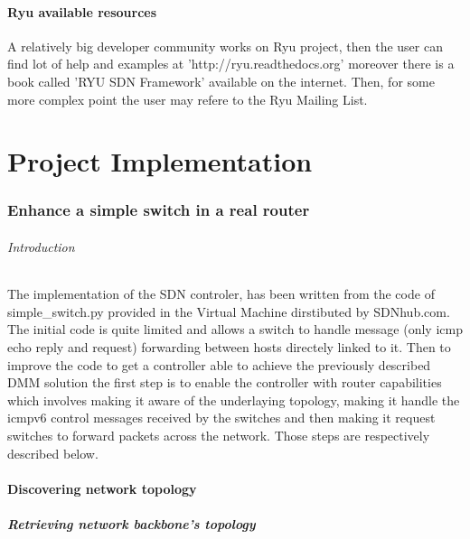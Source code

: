 \documentclass{article}
\begin{document}
\subsection{Ryu available resources}

A relatively big developer community works on Ryu project, then the
user can find lot of help and examples at 'http://ryu.readthedocs.org'
moreover there is a book called 'RYU SDN Framework' available on the
internet.  Then, for some more complex point the user may refere to
the Ryu Mailing List.

\part{Project Implementation}

\section{Enhance a simple switch in a real router}

\paragraph{Introduction}
The implementation of the SDN controler, has been written from the
code of simple\_switch.py provided in the Virtual Machine dirstibuted
by SDNhub.com. The initial code is quite limited and allows a switch
to handle message (only icmp echo reply and request) forwarding between
hosts directely linked to it. Then to improve the code to get a
controller able to achieve the previously described DMM solution the
first step is to enable the controller with router capabilities which
involves making it aware of the underlaying topology, making it handle
the icmpv6 control messages received by the switches and then making
it request switches to forward packets across the network. Those steps
are respectively described below.

\subsection{Discovering network topology}

\subsubsection{Retrieving network backbone's topology}
\end{document}
